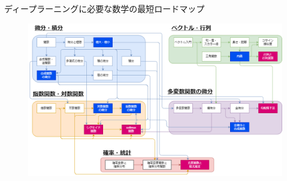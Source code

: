 \documentclass[dvipdfmx,aspectratio=169]{beamer}
\begin{document}
	\begin{frame}{ディープラーニングに必要な数学の最短ロードマップ}
		\begin{figure}
			\centering
			\includegraphics[width=0.85\linewidth]{数学ロードマップ}
		\end{figure}
	\end{frame}
	
\end{document}
